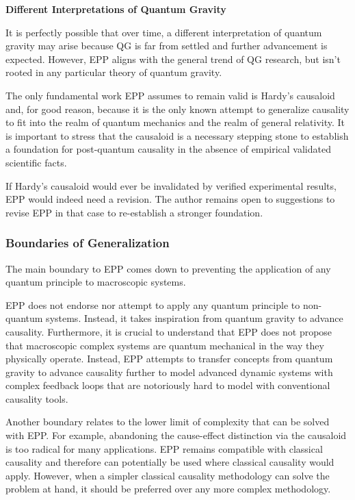 \documentclass{article}
\begin{document}
\textbf{Different Interpretations of Quantum Gravity}

It is perfectly possible that over time, a different interpretation of quantum gravity may arise because QG is far from settled and further advancement is expected. However, EPP aligns with the general trend of QG research, but isn't rooted in any particular theory of quantum gravity.

The only fundamental work EPP assumes to remain valid is Hardy’s causaloid and, for good reason, because it is the only known attempt to generalize causality to fit into the realm of quantum mechanics and the realm of general relativity. It is important to stress that the causaloid is a necessary stepping stone to establish a foundation for post-quantum causality in the absence of empirical validated scientific facts.

If Hardy’s causaloid would ever be invalidated by verified experimental results, EPP would indeed need a revision. The author remains open to suggestions to revise EPP in that case to re-establish a stronger foundation.

\newpage

\subsubsection{Boundaries of Generalization}

The main boundary to EPP comes down to preventing the application of any quantum principle to macroscopic systems.

EPP does not endorse nor attempt to apply any quantum principle to non-quantum systems. Instead, it takes inspiration from quantum gravity to advance causality. Furthermore, it is crucial to understand that EPP does not propose that macroscopic complex systems are quantum mechanical in the way they physically operate. Instead, EPP attempts to transfer concepts from quantum gravity to advance causality further to model advanced dynamic systems with complex feedback loops that are notoriously hard to model with conventional causality tools.

Another boundary relates to the lower limit of complexity that can be solved with EPP. For example, abandoning the cause-effect distinction via the causaloid is too radical for many applications. EPP remains compatible with classical causality and therefore can potentially be used where classical causality would apply. However, when a simpler classical causality methodology can solve the problem at hand, it should be preferred over any more complex methodology.
\end{document}
